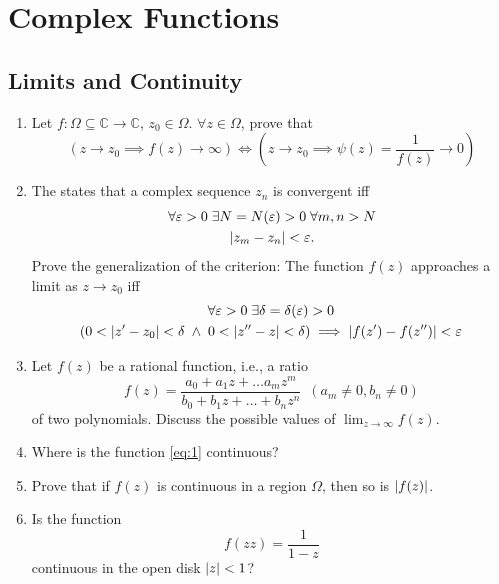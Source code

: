 \documentclass[11pt, oneside]{book}
\begin{document}


\chapter{Complex Functions}
	\label{chapter:complex_functions}

\section{Limits and Continuity} %
\label{sec:limits_and_continuity}

\begin{enumerate}
	\item Let $f : \Omega \subseteq \mathbb{C} \to \mathbb{C}$, $z_0 \in \Omega$. $\forall z \in \Omega$, prove that
	\begin{equation*}
		(z \to z_0 \implies f(z) \to \infty) \iff (z \to z_0 \implies \psi(z) = \frac{1}{f(z)} \to 0)
	\end{equation*}

	\item The  states that a complex sequence $z_n$ is convergent iff
	\begin{gather*}
		\forall \varepsilon > 0 \; \exists N = N(\varepsilon) > 0 \; \forall m, n > N \\
		\left|z_m - z_n\right| < \varepsilon.
	\end{gather*}
	Prove the generalization of the criterion: The function $f(z)$ approaches a limit as $z \to z_0$ iff
	\begin{gather*}
		\forall \varepsilon > 0 \; \exists \delta = \delta(\varepsilon) > 0 \\
		(0 < \left|z' - z_0\right| < \delta \; \land \; 0 < \left|z'' - z\right| < \delta) \implies \left|f(z') - f(z'')\right| < \varepsilon
	\end{gather*}

	\item Let $f(z)$ be a rational function, i.e., a ratio
	\begin{equation}\label{eq:1}
		f(z) = \frac{a_0 + a_1 z + \hdots a_m z^m}{b_0 + b_1z + \hdots + b_n z^n} \enspace (a_m \neq 0, b_n \neq 0)
	\end{equation}
	of two polynomials. Discuss the possible values of $\lim_{z \to \infty} f(z)$.

	\item Where is the function \cref{eq:1} continuous?

	\item Prove that if $f(z)$ is continuous in a region $\Omega$, then so is $\left|f(z)\right|$.

	\item Is the function
	\begin{equation*}
		f(zz) = \frac{1}{1 - z}
	\end{equation*}
	continuous in the open disk $\left|z\right| < 1$?
\end{enumerate}
\end{document}

